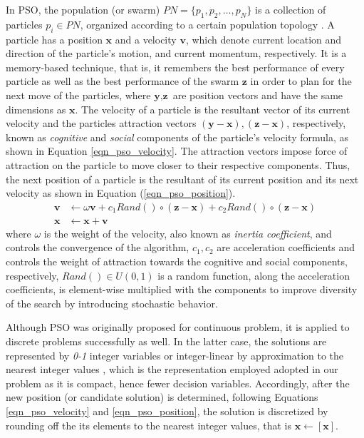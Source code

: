In PSO, the population (or swarm) $PN=\{p_1,p_2,…,p_N\}$ is a collection of particles $p_i\in PN$, organized according to a certain population topology \cite{Liu2016TopologyOptimization}. A particle has a position $\textbf{x}$ and a velocity $\textbf{v}$, which denote current location and direction of the particle's motion, and current momentum, respectively. It is a memory-based technique, that is, it remembers the best performance of every particle as well as the best performance of the swarm $\textbf{z}$ in order to plan for the next move of the particles, where $\textbf{y},\textbf{z}$ are position vectors and have the same dimensions as $\textbf{x}$. The velocity of a particle is the resultant vector of its current velocity and the particles attraction vectors $(\textbf{y}-\textbf{x}), (\textbf{z}-\textbf{x})$, respectively, known as \textit{cognitive} and \textit{social} components of the  particle's velocity formula, as shown in Equation \ref{eqn_pso_velocity}. The attraction vectors impose force of attraction on the particle to move closer to their respective components. Thus, the next position of a particle is the resultant of its current position and its next velocity as shown in Equation (\ref{eqn_pso_position}).
\begin{align}
\label{eqn_pso_velocity}
\textbf{v} &\leftarrow  \omega\textbf{v} + c_1Rand()\circ(\textbf{z}-\textbf{x}) + c_2Rand()\circ(\textbf{z}-\textbf{x})\\
\label{eqn_pso_position}
\textbf{x} &\leftarrow \textbf{x} + \textbf{v}
\end{align}
where $\omega$ is the weight of the velocity, also known as \textit{inertia coefficient}, and controls the convergence of the algorithm, $c_1, c_2$ are acceleration coefficients and controls the weight of attraction towards the cognitive and social components, respectively, $Rand()\in U(0,1)$ is a random function, along the acceleration coefficients, is element-wise multiplied with the components to improve diversity of the search by introducing stochastic behavior.

Although PSO was originally proposed for continuous problem, it is applied to discrete problems successfully as well. In the latter case, the solutions are represented by \textit{0-1} integer variables \cite{KennedyAAlgorithm} or integer-linear by approximation to the nearest integer values \cite{Clerc2000DiscreteProblem}, which is the representation employed adopted in our problem as it is compact, hence fewer decision variables. Accordingly, after the new position (or candidate solution) is determined, following Equations \ref{eqn_pso_velocity} and \ref{eqn_pso_position}, the solution is discretized by rounding off the its elements to the nearest integer values, that is $\textbf{x}\leftarrow [\textbf{x}]$.

